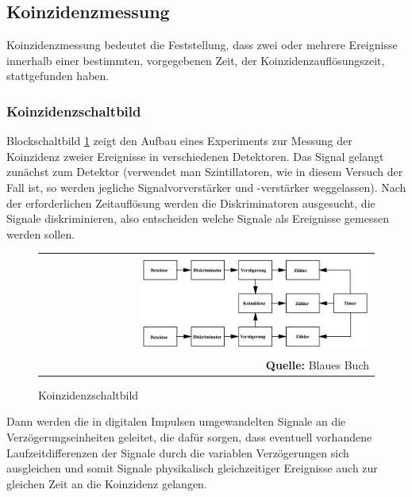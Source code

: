 \documentclass[a4paper,titlepage]{scrartcl}
\numberwithin{equation}{section}
\begin{document}
\subsection{Koinzidenzmessung}
Koinzidenzmessung bedeutet die Feststellung, dass zwei oder mehrere Ereignisse innerhalb einer bestimmten, vorgegebenen Zeit, der Koinzidenzauflösungszeit, stattgefunden haben.
\subsubsection{Koinzidenzschaltbild}
Blockschaltbild \ref{fig:koinzidenzschaltbild} zeigt den Aufbau eines Experiments zur Messung der Koinzidenz zweier Ereignisse in verschiedenen Detektoren. Das Signal gelangt zunächst zum Detektor (verwendet man Szintillatoren, wie in diesem Versuch der Fall ist, so werden jegliche Signalvorverstärker und -verstärker weggelassen). Nach der erforderlichen Zeitauflösung werden die Diskriminatoren ausgesucht, die Signale diskriminieren, also entscheiden welche Signale als Ereignisse gemessen werden sollen.
\begin{figure}[H]
	\centering
	\begin{tabular}{@{}r@{}}
		\includegraphics[width=0.7\textwidth]{koinzidenzmessung.PNG}\\
		\footnotesize\sffamily\textbf{Quelle:} Blaues Buch \cite{blauesBuch}
	\end{tabular}
	\caption{Koinzidenzschaltbild}
    \label{fig:koinzidenzschaltbild}
\end{figure}
Dann werden die in digitalen Impulsen umgewandelten Signale an die Verzögerungseinheiten geleitet, die dafür sorgen, dass eventuell vorhandene Laufzeitdifferenzen der Signale durch die variablen Verzögerungen sich ausgleichen und somit Signale physikalisch gleichzeitiger Ereignisse auch zur gleichen Zeit an die Koinzidenz gelangen.
\end{document}
